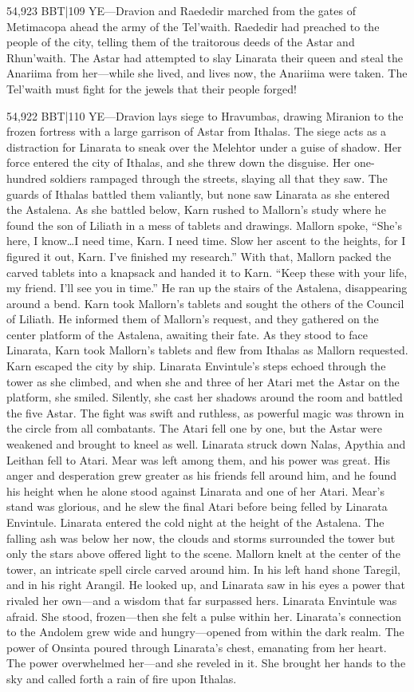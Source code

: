 \documentclass[smalldemyvopaper,11pt,twoside,onecolumn,openright,extrafontsizes]{memoir}
\begin{document}
54,923 BBT|109 YE—Dravion and Raededir marched from the gates of Metimacopa ahead the army of the Tel’waith. Raededir had preached to the people of the city, telling them of the traitorous deeds of the Astar and Rhun’waith. The Astar had attempted to slay Linarata their queen and steal the Anariima from her—while she lived, and lives now, the Anariima were taken. The Tel’waith must fight for the jewels that their people forged!

54,922 BBT|110 YE—Dravion lays siege to Hravumbas, drawing Miranion to the frozen fortress with a large garrison of Astar from Ithalas. The siege acts as a distraction for Linarata to sneak over the Melehtor under a guise of shadow. Her force entered the city of Ithalas, and she threw down the disguise. Her one-hundred soldiers rampaged through the streets, slaying all that they saw. The guards of Ithalas battled them valiantly, but none saw Linarata as she entered the Astalena. As she battled below, Karn rushed to Mallorn’s study where he found the son of Liliath in a mess of tablets and drawings. Mallorn spoke,
“She’s here, I know…I need time, Karn. I need time. Slow her ascent to the heights, for I figured it out, Karn. I’ve finished my research.” With that, Mallorn packed the carved tablets into a knapsack and handed it to Karn. “Keep these with your life, my friend. I’ll see you in time.” He ran up the stairs of the Astalena, disappearing around a bend.
Karn took Mallorn’s tablets and sought the others of the Council of Liliath. He informed them of Mallorn’s request, and they gathered on the center platform of the Astalena, awaiting their fate. As they stood to face Linarata, Karn took Mallorn’s tablets and flew from Ithalas as Mallorn requested. Karn escaped the city by ship. Linarata Envintule’s steps echoed through the tower as she climbed, and when she and three of her Atari met the Astar on the platform, she smiled. Silently, she cast her shadows around the room and battled the five Astar. The fight was swift and ruthless, as powerful magic was thrown in the circle from all combatants. The Atari fell one by one, but the Astar were weakened and brought to kneel as well. Linarata struck down Nalas, Apythia and Leithan fell to Atari. Mear was left among them, and his power was great. His anger and desperation grew greater as his friends fell around him, and he found his height when he alone stood against Linarata and one of her Atari. Mear’s stand was glorious, and he slew the final Atari before being felled by Linarata Envintule.
Linarata entered the cold night at the height of the Astalena. The falling ash was below her now, the clouds and storms surrounded the tower but only the stars above offered light to the scene. Mallorn knelt at the center of the tower, an intricate spell circle carved around him. In his left hand shone Taregil, and in his right Arangil. He looked up, and Linarata saw in his eyes a power that rivaled her own—and a wisdom that far surpassed hers. Linarata Envintule was afraid. She stood, frozen—then she felt a pulse within her. Linarata’s connection to the Andolem grew wide and hungry—opened from within the dark realm. The power of Onsinta poured through Linarata’s chest, emanating from her heart. The power overwhelmed her—and she reveled in it. She brought her hands to the sky and called forth a rain of fire upon Ithalas.
\end{document}
